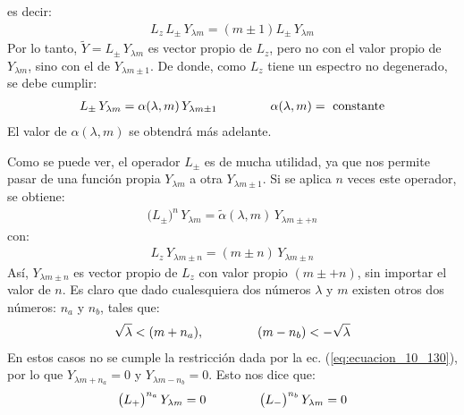 es decir:
\begin{align}
L_{z} \, L_{\pm} \, Y_{\lambda m} = (m \pm 1) L_{\pm} \, Y_{\lambda m}
\label{eq:ecuacion_10_139}
\end{align}
Por lo tanto, $\tilde{Y} = L_{\pm} \, Y_{\lambda m}$ es vector propio de $L_{z}$, pero no con el valor propio de $Y_{\lambda m}$, sino con el de $Y_{\lambda m \pm 1}$. De donde, como $L_{z}$ tiene un espectro no degenerado, se debe cumplir:
\begin{align}
L_{\pm} \, Y_{\lambda m} = \alpha (\lambda, m) \, Y_{\lambda m \pm 1} \hspace{1.5cm} \alpha(\lambda, m) = \mbox{ constante}
\label{eqe:ecuacion_10_140}
\end{align}
El valor de $\alpha (\lambda , m)$ se obtendrá más adelante.
\par
Como se puede ver, el operador $L_{\pm}$ es de mucha utilidad, ya que nos permite pasar de una función propia $Y_{\lambda m}$ a otra $Y_{\lambda m \pm 1}$. Si se aplica $n$ veces este operador, se obtiene:
\begin{align}
\big( L_{\pm} \big)^{n} \, Y_{\lambda m} = \tilde{\alpha} (\lambda, m) \, Y_{\lambda m \pm + n}
\label{eq:ecuacion_10_141}
\end{align}
con:
\begin{align}
L_{z} \, Y_{\lambda m \pm n} = (m \pm n) \, Y_{\lambda m \pm n}
\label{eq:ecuacion_10_142}
\end{align}
Así, $Y_{\lambda m \pm n}$ es vector propio de $L_{z}$  con valor propio $(m \pm +n)$, sin importar el valor de $n$. Es claro que dado cualesquiera dos números $\lambda$ y $m$ existen otros dos números: $n_{a}$ y $n_{b}$, tales que:
\begin{align*}
\sqrt{\lambda} < (m + n_{a}), \hspace{1.5cm} (m - n_{b}) < - \sqrt{\lambda}
\end{align*}
En estos casos no se cumple la restricción dada por la ec. (\ref{eq:ecuacion_10_130}), por lo que $Y_{\lambda m + n_{a}} = 0$ y $Y_{\lambda m -n_{b}} = 0$. Esto nos dice que:
\begin{align}
\big( L_{+} \big)^{n_{a}} \, Y_{\lambda m} = 0 \hspace{1.5cm} \big( L_{-} \big)^{n_{b}} \, Y_{\lambda m} = 0
\label{eq:ecuacion_10_143}
\end{align}

